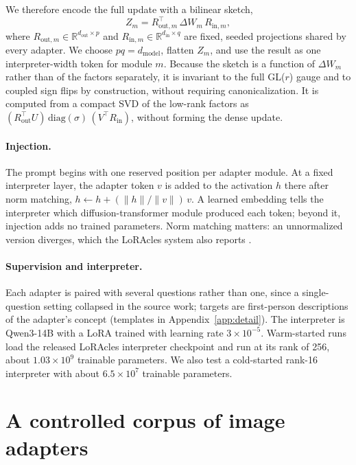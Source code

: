 \documentclass{article}
\begin{document}
We therefore encode the full update with a bilinear sketch,
\[
Z_m = R_{\text{out},m}^{\top}\, \Delta W_m\, R_{\text{in},m},
\]
where $R_{\text{out},m} \in \mathbb{R}^{d_{\text{out}} \times p}$ and $R_{\text{in},m} \in
\mathbb{R}^{d_{\text{in}} \times q}$ are fixed, seeded projections shared by every adapter. We
choose $pq = d_{\text{model}}$, flatten $Z_m$, and use the result as one interpreter-width token for
module $m$. Because the sketch is a function of $\Delta W_m$ rather than of the factors separately,
it is invariant to the full GL($r$) gauge and to coupled sign flips by construction, without
requiring canonicalization. It is computed from a compact SVD of the low-rank factors as
$(R_{\text{out}}^\top U)\,\mathrm{diag}(\sigma)\,(V^\top R_{\text{in}})$, without forming the dense
update.

\paragraph{Injection.}
The prompt begins with one reserved position per adapter module. At a fixed interpreter layer, the
adapter token $v$ is added to the activation $h$ there after norm matching,
$h \leftarrow h + (\lVert h \rVert / \lVert v \rVert)\, v$. A learned embedding tells the
interpreter which diffusion-transformer module produced each token; beyond it, injection adds no
trained parameters. Norm matching matters: an unnormalized version diverges, which the LoRAcles system also
reports \citep{selder2026loracle}.

\paragraph{Supervision and interpreter.}
Each adapter is paired with several questions rather than one, since a single-question setting
collapsed in the source work; targets are first-person descriptions of the adapter's concept
(templates in Appendix~\ref{app:detail}). The interpreter is Qwen3-14B \citep{yang2025qwen3} with a LoRA trained
with learning rate $3\times10^{-5}$. Warm-started runs load the released LoRAcles interpreter
checkpoint \citep{selder2026loracle} and run at its rank of 256, about $1.03\times10^{9}$ trainable
parameters. We also test a cold-started rank-16 interpreter with about $6.5\times10^{7}$ trainable
parameters.

\section{A controlled corpus of image adapters}
\label{sec:corpus}
\end{document}
